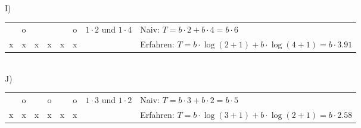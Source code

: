 \documentclass[a4paper,10pt]{article}
\begin{document}
I)\\
\begin{tabular}{|c|c|c|c|c|c|l|l}
\cline{1-6}   & o &   &   &   & o & $1\cdot 2$ und $1\cdot 4$ & Naiv: $T = b\cdot 2+b\cdot 4 = b\cdot 6$ \\
\cline{1-6} x & x & x & x & x & x &   & Erfahren: $T = b\cdot \log(2+1)+b\cdot \log(4+1) = b\cdot 3.91$ \\
\cline{1-6}
\end{tabular} \\

J)\\
\begin{tabular}{|c|c|c|c|c|c|l|l}
\cline{1-6}   & o &   & o &   & o & $1\cdot 3$ und $1\cdot 2$ & Naiv: $T = b\cdot 3+b\cdot 2 = b\cdot 5$ \\
\cline{1-6} x & x & x & x & x & x &   & Erfahren: $T = b\cdot \log(3+1)+b\cdot \log(2+1) = b\cdot 2.58$ \\
\cline{1-6}
\end{tabular} \\
\end{document}
